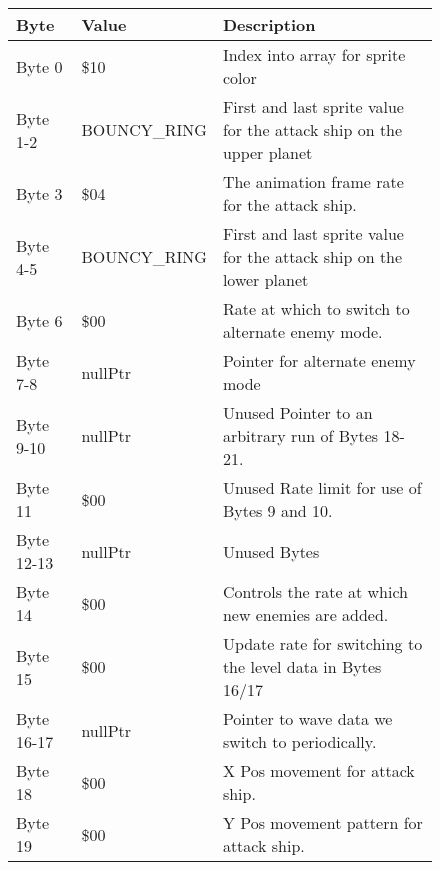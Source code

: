\begin{figure}[H]
  {
  \setlength{\tabcolsep}{3.0pt}
  \setlength\cmidrulewidth{\heavyrulewidth} %
  \begin{adjustbox}{width=12cm}

\begin{tabular}{lll}
\toprule
 Byte       & Value                      & Description                                                         \\
\midrule
 Byte 0     & \$10                        & Index into array for sprite color                                   \\
 Byte 1-2   & BOUNCY\_RING                & First and last sprite value for the attack ship on the upper planet \\
 Byte 3     & \$04                        & The animation frame rate for the attack ship.                       \\
 Byte 4-5   & BOUNCY\_RING                & First and last sprite value for the attack ship on the lower planet \\
 Byte 6     & \$00                        & Rate at which to switch to alternate enemy mode.                    \\
 Byte 7-8   & nullPtr                    & Pointer for alternate enemy mode                                    \\
 Byte 9-10  & nullPtr                    & Unused Pointer to an arbitrary run of Bytes 18-21.                  \\
 Byte 11    & \$00                        & Unused Rate limit for use of Bytes 9 and 10.                        \\
 Byte 12-13 & nullPtr                    & Unused Bytes                                                        \\
 Byte 14    & \$00                        & Controls the rate at which new enemies are added.                   \\
 Byte 15    & \$00                        & Update rate for switching to the level data in Bytes 16/17          \\
 Byte 16-17 & nullPtr                    & Pointer to wave data we switch to periodically.                     \\
 Byte 18    & \$00                        & X Pos movement for attack ship.                                     \\
 Byte 19    & \$00                        & Y Pos movement pattern for attack ship.                             \\

\end{tabular}
\end{adjustbox}}
\end{figure}
